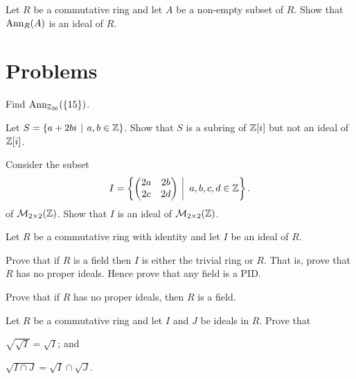 \begin{exercise}\label{exercise-annihilator-is-an-ideal}
    Let $R$ be a commutative ring and let $A$ be a non-empty subset of $R$. Show that $\mathrm{Ann}_{R}(A)$ is an ideal of $R$.
\end{exercise}



\section{Problems}
\begin{problem}
    Find $\mathrm{Ann}_{\mathbb{Z}_{36}}(\{15\})$.
\end{problem}

\begin{problem}
    Let $S = \{a + 2bi \vert a, b \in \Z\}$. Show that $S$ is a subring of $\mathbb{Z}[i]$ but not an ideal of $\mathbb{Z}[i]$.
\end{problem}

\begin{problem}
    Consider the subset
    \[
        I = \left\{\begin{pmatrix}2a&2b\\2c&2d\end{pmatrix} \vert a,b,c,d \in \Z\right\}.
    \]
    of $\mathcal{M}_{2\times2}(\mathbb{Z})$. Show that $I$ is an ideal of $\mathcal{M}_{2\times2}(\mathbb{Z})$.
\end{problem}

\begin{problem}\label{problem-ring-is-field-iff-no-proper-ideals}
    Let $R$ be a commutative ring with identity and let $I$ be an ideal of $R$.
    \begin{partquestions}{\alph*}
        \item Prove that if $R$ is a field then $I$ is either the trivial ring or $R$. That is, prove that $R$ has no proper ideals. Hence prove that any field is a PID.
        \item Prove that if $R$ has no proper ideals, then $R$ is a field.
    \end{partquestions}
\end{problem}

\begin{problem}
    Let $R$ be a commutative ring and let $I$ and $J$ be ideals in $R$. Prove that
    \begin{partquestions}{\alph*}
        \item $\sqrt{\sqrt{I}} = \sqrt{I}$; and
        \item $\sqrt{I \cap J} = \sqrt{I} \cap \sqrt{J}$.
    \end{partquestions}
\end{problem}

